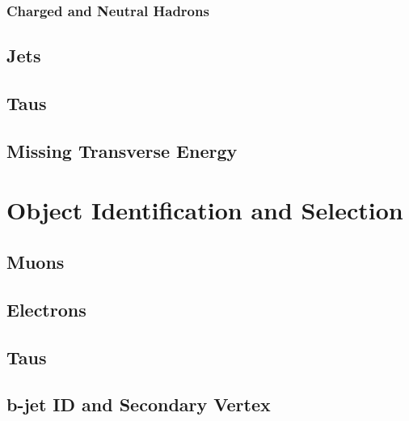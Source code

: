 \subsubsection{Charged and Neutral Hadrons}
\subsection{Jets}
\subsection{Taus}
\subsection{Missing Transverse Energy}
\pagebreak
\section{Object Identification and Selection}
\subsection{Muons}
\subsection{Electrons}
\subsection{Taus}
\subsection{b-jet ID and Secondary Vertex}



